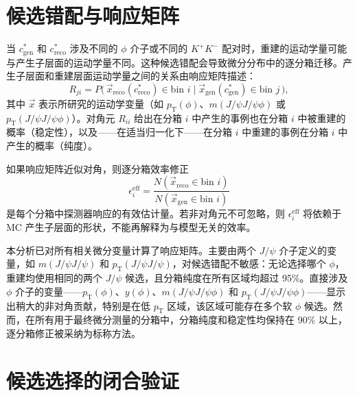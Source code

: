 \section{候选错配与响应矩阵}
\label{sec:response-matrix}

当 $c_{\mathrm{gen}}^{*}$ 和 $c_{\mathrm{reco}}^{*}$ 涉及不同的 $\phi$ 介子或不同的 $K^+K^-$ 配对时，重建的运动学量可能与产生子层面的运动学量不同。这种候选错配会导致微分分布中的逐分箱迁移。产生子层面和重建层面运动学量之间的关系由响应矩阵描述：
\begin{equation}
R_{ji} = P\bigl(\,\vec{x}_{\mathrm{reco}}(c_{\mathrm{reco}}^{*}) \in \text{bin } i \;\big|\; \vec{x}_{\mathrm{gen}}(c_{\mathrm{gen}}^{*}) \in \text{bin } j \,\bigr),
\label{eq:response-matrix}
\end{equation}
其中 $\vec{x}$ 表示所研究的运动学变量（如 $p_{\mathrm T}(\phi)$、$m(J/\psi J/\psi \phi)$ 或 $p_{\mathrm T}(J/\psi J/\psi \phi)$）。对角元 $R_{ii}$ 给出在分箱 $i$ 中产生的事例也在分箱 $i$ 中被重建的概率（稳定性），以及——在适当归一化下——在分箱 $i$ 中重建的事例在分箱 $i$ 中产生的概率（纯度）。

如果响应矩阵近似对角，则逐分箱效率修正
\begin{equation}
\label{eq:bin-by-bin-efficiency}
\epsilon_i^{\mathrm{eff}} = \frac{N(\vec{x}_{\mathrm{reco}} \in \text{bin } i)}
                               {N(\vec{x}_{\mathrm{gen}} \in \text{bin } i)}
\end{equation}
是每个分箱中探测器响应的有效估计量。若非对角元不可忽略，则 $\epsilon_i^{\mathrm{eff}}$ 将依赖于 MC 产生子层面的形状，不能再解释为与模型无关的效率。

本分析已对所有相关微分变量计算了响应矩阵。主要由两个 $J/\psi$ 介子定义的变量，如 $m(J/\psi J/\psi)$ 和 $p_{\mathrm T}(J/\psi J/\psi)$，对候选错配不敏感：无论选择哪个 $\phi$，重建均使用相同的两个 $J/\psi$ 候选，且分箱纯度在所有区域均超过 95\%。直接涉及 $\phi$ 介子的变量——$p_{\mathrm T}(\phi)$、$y(\phi)$、$m(J/\psi J/\psi \phi)$ 和 $p_{\mathrm T}(J/\psi J/\psi \phi)$——显示出稍大的非对角贡献，特别是在低 $p_{\mathrm T}$ 区域，该区域可能存在多个软 $\phi$ 候选。然而，在所有用于最终微分测量的分箱中，分箱纯度和稳定性均保持在 90\% 以上，逐分箱修正被采纳为标称方法。

\section{候选选择的闭合验证}
\label{sec:candidate-closure}

